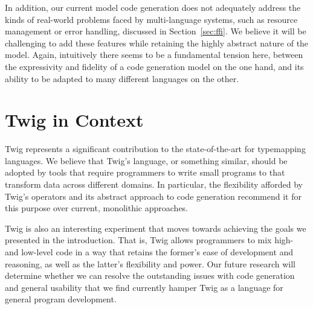In addition, our current model code generation does not adequately
address the kinds of real-world problems faced by multi-language
systems, such as resource management or error handling, discussed
in Section~\ref{sec:ffi}. We believe it will be challenging to add
these features while retaining the highly abstract nature of the
model. Again, intuitively there seems to be a fundamental tension
here, between the expressivity and fidelity of a code generation
model on the one hand, and its ability to be adapted to many
different languages on the other.

\section{Twig in Context}

Twig represents a significant contribution to the state-of-the-art
for typemapping languages. We believe that Twig's language, or
something similar, should be adopted by tools that require
programmers to write small programs to that transform data across
different domains. In particular, the flexibility afforded by
Twig's operators and its abstract approach to code generation
recommend it for this purpose over current, monolithic approaches.

Twig is also an interesting experiment that moves towards
achieving the goals we presented in the introduction. That is,
Twig allows programmers to mix high- and low-level code in a way
that retains the former's ease of development and reasoning, as
well as the latter's flexibility and power. Our future research
will determine whether we can resolve the outstanding issues with
code generation and general usability that we find currently
hamper Twig as a language for general program development.
